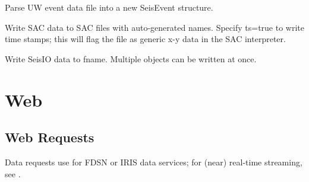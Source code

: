 \documentclass[letterpaper,11pt,english]{sphinxmanual}
\begin{document}
\begin{fulllineitems}
\label{\detokenize{src/Formats/fileformats:uwdf}}
\end{fulllineitems}


Parse UW event data file  into a new SeisEvent structure.

\begin{fulllineitems}
\label{\detokenize{src/Formats/fileformats:writesac}}
\end{fulllineitems}


Write SAC data to SAC files with auto-generated names. Specify ts=true to write
time stamps; this will flag the file as generic x-y data in the SAC interpreter.

\begin{fulllineitems}
\label{\detokenize{src/Formats/fileformats:wseis}}
\end{fulllineitems}


\begin{fulllineitems}
\end{fulllineitems}


Write SeisIO data to fname. Multiple objects can be written at once.


\chapter{Web}
\label{\detokenize{index:web}}

\section{Web Requests}
\label{\detokenize{src/Web/webclients:web-requests}}\label{\detokenize{src/Web/webclients:getdata}}\label{\detokenize{src/Web/webclients::doc}}
Data requests use  for FDSN or IRIS data services; for (near)
real-time streaming, see {\hyperref[\detokenize{src/Web/seedlink:seedlink-section}]{}}.
\end{document}
